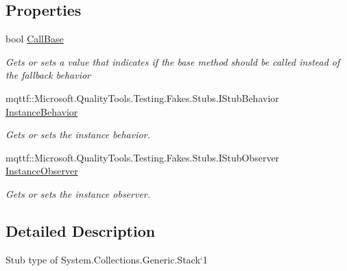 \subsection*{Properties}
\begin{DoxyCompactItemize}
\item 
bool \hyperlink{class_system_1_1_collections_1_1_generic_1_1_fakes_1_1_stub_stack_3_01_t_01_4_a523232d4029318f9f2f73d4cd5ead066}{Call\-Base}
\begin{DoxyCompactList}\small\item\em Gets or sets a value that indicates if the base method should be called instead of the fallback behavior\end{DoxyCompactList}\item 
mqttf\-::\-Microsoft.\-Quality\-Tools.\-Testing.\-Fakes.\-Stubs.\-I\-Stub\-Behavior \hyperlink{class_system_1_1_collections_1_1_generic_1_1_fakes_1_1_stub_stack_3_01_t_01_4_a2fb34c5256153fb292ef8a0e85f8927c}{Instance\-Behavior}
\begin{DoxyCompactList}\small\item\em Gets or sets the instance behavior.\end{DoxyCompactList}\item 
mqttf\-::\-Microsoft.\-Quality\-Tools.\-Testing.\-Fakes.\-Stubs.\-I\-Stub\-Observer \hyperlink{class_system_1_1_collections_1_1_generic_1_1_fakes_1_1_stub_stack_3_01_t_01_4_a4b5588099cc15559be0e41574681e384}{Instance\-Observer}
\begin{DoxyCompactList}\small\item\em Gets or sets the instance observer.\end{DoxyCompactList}\end{DoxyCompactItemize}


\subsection{Detailed Description}
Stub type of System.\-Collections.\-Generic.\-Stack`1



